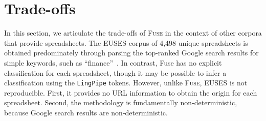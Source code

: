 \documentclass[conference]{IEEEtran}
\begin{document}
    







\section{Trade-offs}
\label{sec:trade-offs}

In this section, we articulate the trade-offs of \textsc{Fuse} in the context of other corpora that provide spreadsheets. The EUSES corpus of 4,498 unique spreadsheets is obtained predominately through parsing the top-ranked Google search results for simple keywords, such as ``finance''~\cite{Fisher2005}. In contrast, Fuse has no explicit classification for each spreadsheet, though it may be possible to infer a classification using the \texttt{LingPipe} tokens. However, unlike \textsc{Fuse}, EUSES is not reproducible. First, it provides no URL information to obtain the origin for each spreadsheet. Second, the methodology is fundamentally non-deterministic, because Google search results are non-deterministic.
\end{document}
